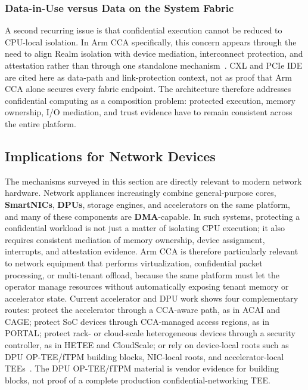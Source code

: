 \subsubsection{Data-in-Use versus Data on the System Fabric}

A second recurring issue is that confidential execution cannot be reduced to CPU-local isolation. In Arm CCA specifically, this concern appears through the need to align Realm isolation with device mediation, interconnect protection, and attestation rather than through one standalone mechanism~\cite{arm_cca_spec,arm_rme_spec,arm_smmu_spec,cxl_spec,pcie_ide}. CXL and PCIe IDE are cited here as data-path and link-protection context, not as proof that Arm CCA alone secures every fabric endpoint. The architecture therefore addresses confidential computing as a composition problem: protected execution, memory ownership, I/O mediation, and trust evidence have to remain consistent across the entire platform.

\subsection{Implications for Network Devices}

The mechanisms surveyed in this section are directly relevant to modern network hardware. Network appliances increasingly combine general-purpose cores, \textbf{SmartNICs}, \textbf{DPUs}, storage engines, and accelerators on the same platform, and many of these components are \textbf{DMA}-capable. In such systems, protecting a confidential workload is not just a matter of isolating CPU execution; it also requires consistent mediation of memory ownership, device assignment, interrupts, and attestation evidence. Arm CCA is therefore particularly relevant to network equipment that performs virtualization, confidential packet processing, or multi-tenant offload, because the same platform must let the operator manage resources without automatically exposing tenant memory or accelerator state. Current accelerator and DPU work shows four complementary routes: protect the accelerator through a CCA-aware path, as in ACAI and CAGE; protect SoC devices through CCA-managed access regions, as in PORTAL; protect rack- or cloud-scale heterogeneous devices through a security controller, as in HETEE and CloudScale; or rely on device-local roots such as DPU OP-TEE/fTPM building blocks, NIC-local roots, and accelerator-local TEEs~\cite{acai2023,wang2026cage,sang2025portal,zhu2020hetee,dhar2024cloudscale,nvidia_bluefield_operation_2025,giantsidi2025tnic,vaswani2023itx}. The DPU OP-TEE/fTPM material is vendor evidence for building blocks, not proof of a complete production confidential-networking TEE.

